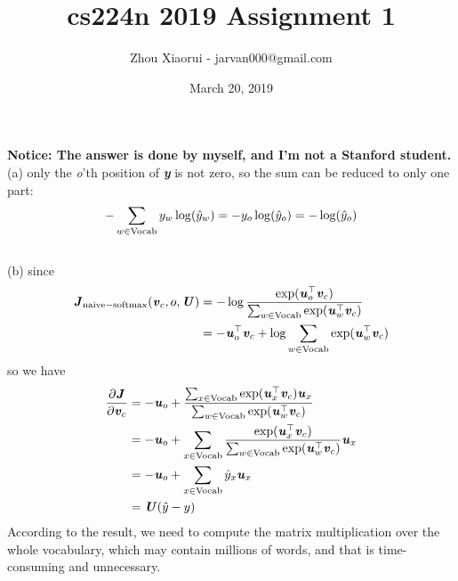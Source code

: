 \documentclass{article}
\title{cs224n 2019 Assignment 1}
\author{Zhou Xiaorui - jarvan000@gmail.com}
\date{March 20, 2019}
\begin{document}
\maketitle
\textbf{Notice: The answer is done by myself, and I'm not a Stanford student.}
\\
(a) only the \textit{o}'th position of \textbf{\textit{y}} is not zero, so the sum can be reduced to only one part:
\begin{equation}
    -\sum_{w \in {\rm Vocab}} {y_w \log(\hat{y}_w)} = - y_o \log(\hat{y}_o) = - \log(\hat{y}_o)
\end{equation}
\\
(b) since
\begin{equation}
\begin{aligned}
    \textbf{\textit{J}}_{\rm naive-softmax}(\textbf{\textit{v}}_c, o, \textbf{\textit{U}}) &= -\log \frac {\exp (\textbf{\textit{u}}_o^\top \textbf{\textit{v}}_c)} {\sum_{w \in {\rm Vocab}} {\exp (\textbf{\textit{u}}_w^\top \textbf{\textit{v}}_c)}} \\
    &= - \textbf{\textit{u}}_o^\top \textbf{\textit{v}}_c + \log \sum_{w \in {\rm Vocab}} {\exp (\textbf{\textit{u}}_w^\top \textbf{\textit{v}}_c)}
\end{aligned}
\end{equation}
so we have
\begin{equation*}
\begin{aligned}
    \frac {\partial \textbf{\textit{J}}} {\partial \textbf{\textit{v}}_c} &= -\textbf{\textit{u}}_o + {\frac {\sum_{x \in {\rm Vocab}} {\exp (\textbf{\textit{u}}_x^\top \textbf{\textit{v}}_c) \textbf{\textit{u}}_x}} {\sum_{w \in {\rm Vocab}} {\exp (\textbf{\textit{u}}_w^\top \textbf{\textit{v}}_c)}}} \\
    &= -\textbf{\textit{u}}_o + \sum_{x \in {\rm Vocab}} {\frac {\exp (\textbf{\textit{u}}_x^\top \textbf{\textit{v}}_c)} {\sum_{w \in {\rm Vocab}} {\exp (\textbf{\textit{u}}_w^\top \textbf{\textit{v}}_c)}} \textbf{\textit{u}}_x} \\
    &= -\textbf{\textit{u}}_o + \sum_{x \in {\rm Vocab}} {\hat{y}_x \textbf{\textit{u}}_x} \\
    &= \textbf{\textit{U}} (\hat{y} - y)
\end{aligned}
\end{equation*}
According to the result, we need to compute the matrix multiplication over the whole vocabulary, which may contain millions of words, and that is time-consuming and unnecessary.
\\
\\
\end{document}
